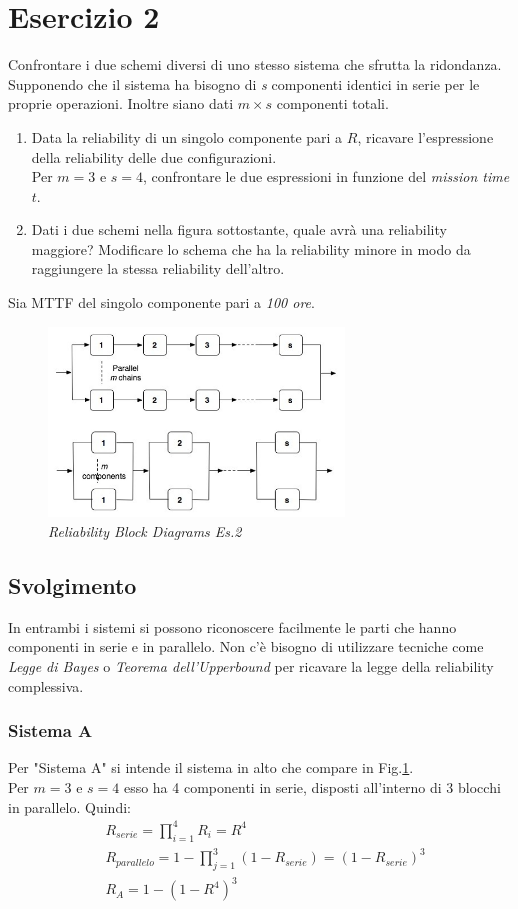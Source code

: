 \section{Esercizio 2}
Confrontare i due schemi diversi di uno stesso sistema che sfrutta la ridondanza. Supponendo che il sistema ha bisogno di \textit{s} componenti identici in serie per le proprie operazioni. Inoltre siano dati $m \times s$ componenti totali. 
\begin{enumerate}
	\item Data la reliability di un singolo componente pari a $R$, ricavare l'espressione della reliability delle due configurazioni.
	\\Per $m=3$ e $s=4$, confrontare le due espressioni in funzione del \textit{mission time} $t$.
	\item Dati i due schemi nella figura sottostante, quale avrà una reliability maggiore? Modificare lo schema che ha la reliability minore in modo da raggiungere la stessa reliability dell'altro.
\end{enumerate}
Sia MTTF del singolo componente pari a \textit{100 ore}.
\begin{figure}[H]
	\label{es2}
	\centering
	\includegraphics[width=0.7\textwidth]{img/hw5/es2.png}
	\caption{\textit{Reliability Block Diagrams Es.2}}
\end{figure}
\subsection{Svolgimento}
In entrambi i sistemi si possono riconoscere facilmente le parti che hanno componenti in serie e in parallelo. Non c'è bisogno di utilizzare tecniche come \textit{Legge di Bayes} o \textit{Teorema dell'Upperbound} per ricavare la legge della reliability complessiva.
\subsubsection{Sistema A}
Per "Sistema A" si intende il sistema in alto che compare in Fig.\ref{es2}.
\\Per $m=3$ e $s=4$ esso ha 4 componenti in serie, disposti all'interno di 3 blocchi in parallelo. Quindi:
\begin{equation*}
	\begin{split}
			&R_{serie} = \prod_{i=1}^{4} R_i = R^4 \\
			&R_{parallelo} = 1 - \prod_{j=1}^{3}(1-R_{serie}) = (1-R_{serie})^3 \\
			&R_A = 1-(1-R^4)^3
	\end{split}
\end{equation*}
